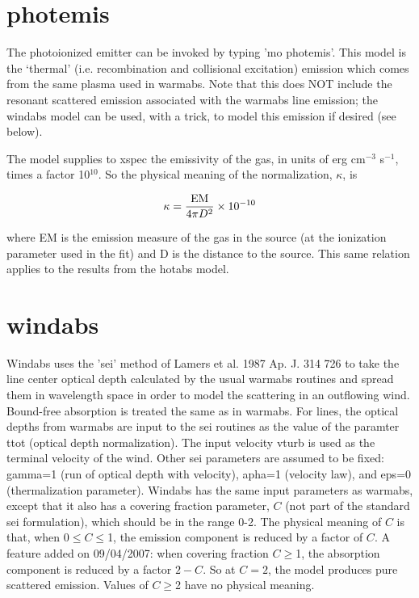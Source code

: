 \section{photemis}

The photoionized emitter can be invoked by typing 'mo photemis'.  This model is 
the `thermal' (i.e. recombination and collisional excitation) emission which 
comes from the same plasma used in warmabs.  Note that this does NOT include the 
resonant scattered emission associated with the warmabs line emission; the windabs
model can be used, with a trick, to model this emission if desired (see below).

The model supplies to xspec the emissivity of the gas, in units of 
erg cm$^{-3}$ s$^{-1}$, times a factor 10$^{10}$.  So the physical meaning of the 
normalization, $\kappa$, is

\begin{equation}
\kappa=\frac{{\rm EM}}{4\pi D^2} \times 10^{-10}
\end{equation}

\noindent where EM is the emission measure of the gas 
in the source (at the ionization parameter used in the fit) and D is the distance to 
the source.  This same relation applies to the results from the hotabs model.

\section{windabs}

Windabs uses the 'sei' method of 
Lamers et al. 1987 Ap. J. 314 726 to take the line center optical depth 
calculated by the usual warmabs routines and spread them in wavelength 
space in order to model the scattering 
in an outflowing wind.  Bound-free absorption is treated 
the same as in warmabs.  For lines, the optical depths from warmabs
are input to the sei routines as the value of the 
paramter ttot (optical depth normalization).  
The input velocity vturb is used as the terminal velocity of the wind.
 Other sei parameters are assumed to be fixed:  gamma=1 (run of optical 
depth with velocity), apha=1 (velocity law), and eps=0 
(thermalization parameter).
Windabs has the same input parameters as warmabs, 
except that it also has a covering fraction parameter, $C$ 
(not part of the standard sei formulation),
which should be in the range 0-2.  
The physical meaning of $C$ is that, when 
0$\leq C \leq$1, the emission component is reduced by a factor of $C$.
A feature added on 09/04/2007: when covering fraction $C\geq$1, 
the absorption component is reduced by a factor $2-C$.  So at $C=2$, the model 
produces pure scattered emission.  Values of $C\geq$2 have no physical meaning.

